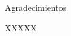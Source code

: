 \newpage
\thispagestyle{empty}

{ \flushright

\begin{LARGE}
Agradecimientos
\end{LARGE}

\hspace{3mm}

\begin{large}
XXXXX
\end{large}

}